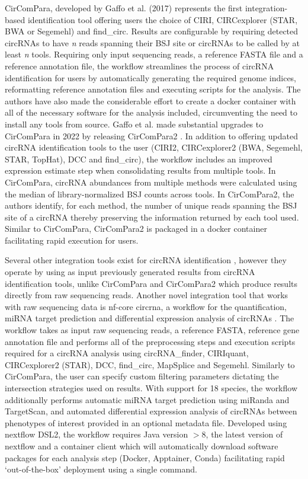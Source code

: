 \documentclass[pdflatex,sn-mathphys-num]{sn-jnl}
\begin{document}
CirComPara, developed by Gaffo et al. (2017) \cite{CirComPara} represents the first integration-based identification tool offering users the choice of CIRI, CIRCexplorer (STAR, BWA or Segemehl) and find\_circ. Results are configurable by requiring detected circRNAs to have \textit{n} reads spanning their BSJ site or circRNAs to be called by at least \textit{n} tools. Requiring only input sequencing reads, a reference FASTA file and a reference annotation file, the workflow streamlines the process of circRNA identification for users by automatically generating the required genome indices, reformatting reference annotation files and executing scripts for the analysis. The authors have also made the considerable effort to create a docker container with all of the necessary software for the analysis included, circumventing the need to install any tools from source. Gaffo et al. made substantial upgrades to CirComPara in 2022 by releasing CirComPara2 \cite{CirComPara2}. In addition to offering updated circRNA identification tools to the user (CIRI2, CIRCexplorer2 (BWA, Segemehl, STAR, TopHat), DCC and find\_circ), the workflow includes an improved expression estimate step when consolidating results from multiple tools. In CirComPara, circRNA abundances from multiple methods were calculated using the median of library-normalized BSJ counts across tools. In CirComPara2, the authors identify, for each method, the number of unique reads spanning the BSJ site of a circRNA thereby preserving the information returned by each tool used. Similar to CirComPara, CirComPara2 is packaged in a docker container facilitating rapid execution for users. \par
Several other integration tools exist for circRNA identification \cite{circRNAwrap, DEBKS, circmeta, circRNAprofiler, FcircSEC}, however they operate by using as input previously generated results from circRNA identification tools, unlike CirComPara and CirComPara2 which produce results directly from raw sequencing reads. Another novel integration tool that works with raw sequencing data is nf-core circrna, a workflow for the quantification, miRNA target prediction and differential expression analysis of circRNAs \cite{Digby2023Dec}. The workflow takes as input raw sequencing reads, a reference FASTA, reference gene annotation file and performs all of the preprocessing steps and execution scripts required for a circRNA analysis using circRNA\_finder, CIRIquant, CIRCexplorer2 (STAR), DCC, find\_circ, MapSplice and Segemehl. Similarly to CirComPara, the user can specify custom filtering parameters dictating the intersection strategies used on results. With support for 18 species, the workflow additionally performs automatic miRNA target prediction using miRanda and TargetScan, and automated differential expression analysis of circRNAs between phenotypes of interest provided in an optional metadata file. Developed using nextflow DSL2, the workflow requires Java version $>$8, the latest version of nextflow and a container client which will automatically download software packages for each analysis step (Docker, Apptainer, Conda) facilitating rapid `out-of-the-box' deployment using a single command.
\end{document}
